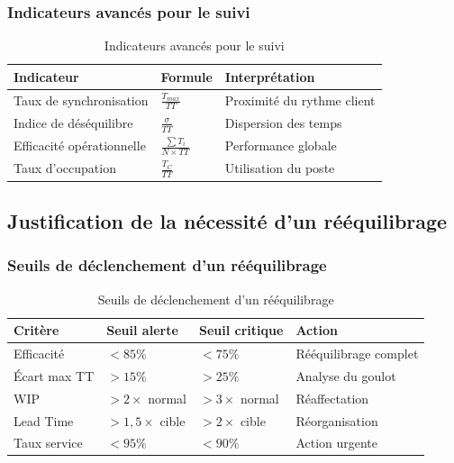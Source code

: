\documentclass[12pt,a4paper]{article}
\begin{document}
\subsubsection{Indicateurs avancés pour le suivi}

\begin{table}[H]
\centering
\begin{tabular}{|p{3.5cm}|p{3.5cm}|p{5cm}|}
\hline
\textbf{Indicateur} & \textbf{Formule} & \textbf{Interprétation} \\
\hline
Taux de synchronisation & $\frac{T_{max}}{TT}$ & Proximité du rythme client \\
\hline
Indice de déséquilibre & $\frac{\sigma}{TT}$ & Dispersion des temps \\
\hline
Efficacité opérationnelle & $\frac{\sum T_i}{N \times TT}$ & Performance globale \\
\hline
Taux d'occupation & $\frac{T_C}{TT}$ & Utilisation du poste \\
\hline
\end{tabular}
\caption{Indicateurs avancés pour le suivi}
\end{table}

\subsection{Justification de la nécessité d'un rééquilibrage}

\subsubsection{Seuils de déclenchement d'un rééquilibrage}

\begin{table}[H]
\centering
\begin{tabular}{|p{4cm}|p{3cm}|p{3cm}|p{3cm}|}
\hline
\textbf{Critère} & \textbf{Seuil alerte} & \textbf{Seuil critique} & \textbf{Action} \\
\hline
Efficacité & $< 85\%$ & $< 75\%$ & Rééquilibrage complet \\
\hline
Écart max TT & $> 15\%$ & $> 25\%$ & Analyse du goulot \\
\hline
WIP & $> 2\times$ normal & $> 3\times$ normal & Réaffectation \\
\hline
Lead Time & $> 1,5\times$ cible & $> 2\times$ cible & Réorganisation \\
\hline
Taux service & $< 95\%$ & $< 90\%$ & Action urgente \\
\hline
\end{tabular}
\caption{Seuils de déclenchement d'un rééquilibrage}
\end{table}
\end{document}
